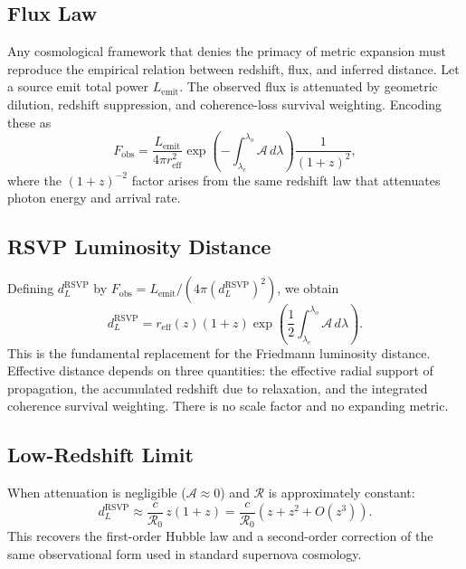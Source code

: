 \documentclass[12pt,a4paper]{article}
\theoremstyle{remark}
\newcommand{\Rcal}{\mathcal{R}}
\newcommand{\Acal}{\mathcal{A}}
\newcommand{\reff}{r_{\mathrm{eff}}}
\newcommand{\dL}{d_L^{\mathrm{RSVP}}}
\begin{document}
\subsection{Flux Law}

Any cosmological framework that denies the primacy of metric expansion must reproduce the empirical relation between redshift, flux, and inferred distance. Let a source emit total power $L_{\mathrm{emit}}$. The observed flux is attenuated by geometric dilution, redshift suppression, and coherence-loss survival weighting. Encoding these as
\begin{equation}
F_{\mathrm{obs}} = \frac{L_{\mathrm{emit}}}{4\pi \reff^2} \exp\!\left(-\int_{\lambda_e}^{\lambda_o} \Acal\, d\lambda\right) \frac{1}{(1+z)^2},
\label{eq:flux}
\end{equation}
where the $(1+z)^{-2}$ factor arises from the same redshift law that attenuates photon energy and arrival rate.

\subsection{RSVP Luminosity Distance}

Defining $\dL$ by $F_{\mathrm{obs}} = L_{\mathrm{emit}} / (4\pi (\dL)^2)$, we obtain
\begin{equation}
\boxed{\dL = \reff(z)(1+z) \exp\!\left(\frac{1}{2}\int_{\lambda_e}^{\lambda_o} \Acal\, d\lambda\right).}
\label{eq:dL}
\end{equation}
This is the fundamental replacement for the Friedmann luminosity distance. Effective distance depends on three quantities: the effective radial support of propagation, the accumulated redshift due to relaxation, and the integrated coherence survival weighting. There is no scale factor and no expanding metric.

\subsection{Low-Redshift Limit}

When attenuation is negligible ($\Acal \approx 0$) and $\Rcal$ is approximately constant:
\begin{equation}
\dL \approx \frac{c}{\Rcal_0}\, z(1+z) = \frac{c}{\Rcal_0}\left(z + z^2 + O(z^3)\right).
\end{equation}
This recovers the first-order Hubble law and a second-order correction of the same observational form used in standard supernova cosmology.
\end{document}
